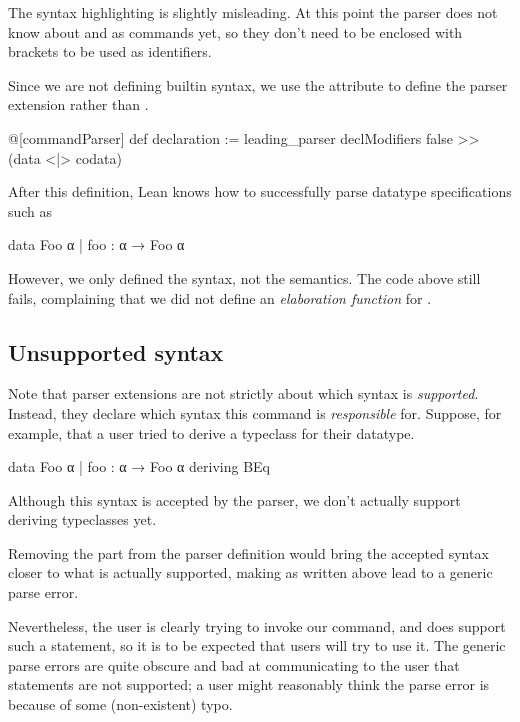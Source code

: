 \begin{remark}
    The syntax highlighting is slightly misleading. At this point the parser does not know about \data{} and \codata{} as commands yet, so they don't need to be enclosed with  brackets to be used as identifiers.
\end{remark}

Since we are not defining builtin syntax, we use the  attribute to define the parser extension
rather than .

\begin{leancode}
  @[commandParser] def declaration := leading_parser 
      declModifiers false >> (data <|> codata)
\end{leancode}


After this definition, Lean knows how to successfully parse datatype specifications such as
\begin{badleancode}
  data Foo α
    | foo : α → Foo α
\end{badleancode}

However, we only defined the syntax, not the semantics. 
The code above still fails, complaining that we did not define an \emph{elaboration function} for .


\subsection*{Unsupported syntax}%
\label{subsec:impl:unsupported_syntax}

Note that parser extensions are not strictly about which syntax is \emph{supported}.
Instead, they declare which syntax this command is \emph{responsible} for.
Suppose, for example, that a user tried to derive a typeclass for their datatype.
\begin{badleancode}
  data Foo α
    | foo : α → Foo α
    deriving BEq
\end{badleancode}

Although this syntax is accepted by the \data{} parser, we don't actually support deriving typeclasses yet.

Removing the  part from the parser definition would bring the accepted syntax closer to what is actually supported, making  as written above lead to a generic parse error.

Nevertheless, the user is clearly trying to invoke our \data{} command, and \inductive{} does support such a  statement, so it is to be expected that users will try to use it. The generic parse errors are quite obscure and bad at communicating to the user that  statements are not supported; a user might reasonably think the parse error is because of some (non-existent) typo.

